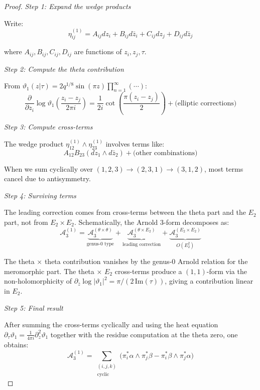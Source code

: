 \begin{proof}

\emph{Step 1: Expand the wedge products}

Write:
\begin{equation}
\eta_{ij}^{(1)} = A_{ij} dz_i + B_{ij} d\bar{z}_i + C_{ij} dz_j + D_{ij} d\bar{z}_j
\end{equation}

where $A_{ij}, B_{ij}, C_{ij}, D_{ij}$ are functions of $z_i, z_j, \tau$.

\emph{Step 2: Compute the theta contribution}

From $\vartheta_1(z|\tau) = 2q^{1/8}\sin(\pi z) \prod_{n=1}^{\infty} (\cdots)$:
\begin{equation}
\frac{\partial}{\partial z_i} \log \vartheta_1\left(\frac{z_i - z_j}{2\pi i}\right) 
= \frac{1}{2i} \cot\left(\frac{\pi(z_i - z_j)}{2}\right) + \text{(elliptic corrections)}
\end{equation}

\emph{Step 3: Compute cross-terms}

The wedge product $\eta_{12}^{(1)} \wedge \eta_{23}^{(1)}$ involves terms like:
\begin{equation}
A_{12} B_{23} (dz_1 \wedge d\bar{z}_2) + \text{(other combinations)}
\end{equation}

When we sum cyclically over $(1,2,3) \to (2,3,1) \to (3,1,2)$, most terms cancel due to antisymmetry.

\emph{Step 4: Surviving terms}

The leading correction comes from cross-terms between the theta part and the $E_2$ part, not from $E_2 \times E_2$.  Schematically, the Arnold 3-form decomposes as:
\begin{equation}
\mathcal{A}_3^{(1)} = \underbrace{\mathcal{A}_3^{(\theta \times \theta)}}_{\text{genus-0 type}} + \underbrace{\mathcal{A}_3^{(\theta \times E_2)}}_{\text{leading correction}} + \underbrace{\mathcal{A}_3^{(E_2 \times E_2)}}_{O(E_2^2)}
\end{equation}

The theta $\times$ theta contribution vanishes by the genus-0 Arnold relation for the meromorphic part.  The theta $\times$ $E_2$ cross-terms produce a $(1,1)$-form via the non-holomorphicity of $\partial_{\bar{z}} \log |\vartheta_1|^2 = \pi/(2\,\mathrm{Im}(\tau))$, giving a contribution linear in $E_2$.

\emph{Step 5: Final result}

After summing the cross-terms cyclically and using the heat equation $\partial_\tau \vartheta_1 = \frac{1}{4\pi i}\partial_z^2 \vartheta_1$ together with the residue computation at the theta zero, one obtains:
\begin{equation}
\mathcal{A}_3^{(1)} = \sum_{\substack{(i,j,k) \\ \text{cyclic}}} \bigl(\pi_i^*\alpha \wedge \pi_j^*\beta - \pi_i^*\beta \wedge \pi_j^*\alpha\bigr)
\end{equation}


\end{proof}
